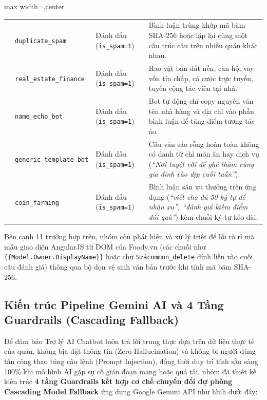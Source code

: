 \documentclass[12pt, a4paper]{article}
\begin{document}
\begin{table}[!htbp]
\begin{adjustbox}{max width=\textwidth,center}
\begin{tabularx}{0.97\textwidth}{c l l X}
\addlinespace
7 & \texttt{duplicate\_spam} & Đánh dấu (\texttt{is\_spam=1}) & Bình luận trùng khớp mã băm SHA-256 hoặc lặp lại cùng một cấu trúc câu trên nhiều quán khác nhau. \\
\addlinespace
8 & \texttt{real\_estate\_finance} & Đánh dấu (\texttt{is\_spam=1}) & Rao vặt bán đất nền, căn hộ, vay vốn tín chấp, cá cược trực tuyến, tuyển cộng tác viên tại nhà. \\
\addlinespace
9 & \texttt{name\_echo\_bot} & Đánh dấu (\texttt{is\_spam=1}) & Bot tự động chỉ copy nguyên văn tên nhà hàng và địa chỉ vào phần bình luận để tăng điểm tương tác ảo. \\
\addlinespace
10 & \texttt{generic\_template\_bot} & Đánh dấu (\texttt{is\_spam=1}) & Câu văn sáo rỗng hoàn toàn không có danh từ chỉ món ăn hay dịch vụ (\textit{``Nơi tuyệt vời để ghé thăm cùng gia đình vào dịp cuối tuần''}). \\
\addlinespace
11 & \texttt{coin\_farming} & Đánh dấu (\texttt{is\_spam=1}) & Bình luận săn xu thưởng trên ứng dụng (\textit{``viết cho đủ 50 ký tự để nhận xu'', ``đánh giá kiếm điểm đổi quà''}) kèm chuỗi ký tự kéo dài. \\
\bottomrule
\end{tabularx}
\end{adjustbox}
\end{table}

Bên cạnh 11 trường hợp trên, nhóm còn phát hiện và xử lý triệt để lỗi rò rỉ mã mẫu giao diện AngularJS từ DOM của Foody.vn (các chuỗi như \texttt{\{\{Model.Owner.DisplayName\}\}} hoặc chữ \texttt{Sửacommon\_delete} dính liền vào cuối câu đánh giá) thông qua bộ dọn vệ sinh văn bản trước khi tính mã băm SHA-256.

\vspace{0.2cm}
\subsection{Kiến trúc Pipeline Gemini AI và 4 Tầng Guardrails (Cascading Fallback)}
Để đảm bảo Trợ lý AI Chatbot luôn trả lời trung thực dựa trên dữ liệu thực tế của quán, không bịa đặt thông tin (Zero Hallucination) và không bị người dùng tấn công thao túng câu lệnh (Prompt Injection), đồng thời duy trì tính sẵn sàng 100\% khi mô hình AI gặp sự cố gián đoạn mạng hoặc quá tải, nhóm đã thiết kế kiến trúc \textbf{4 tầng Guardrails kết hợp cơ chế chuyển đổi dự phòng Cascading Model Fallback} ứng dụng Google Gemini API \cite{google2025gemini} như hình dưới đây:
\end{document}
